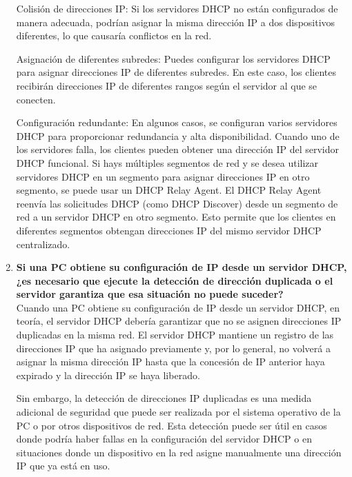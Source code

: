 \documentclass[a4paper]{article}
\begin{document}
\begin{enumerate}
	Colisión de direcciones IP: Si los servidores DHCP no están configurados de manera adecuada, podrían asignar la misma dirección IP a dos dispositivos diferentes, lo que causaría conflictos en la red.
	
	Asignación de diferentes subredes: Puedes configurar los servidores DHCP para asignar direcciones IP de diferentes subredes. En este caso, los clientes recibirán direcciones IP de diferentes rangos según el servidor al que se conecten.
	
	Configuración redundante: En algunos casos, se configuran varios servidores DHCP para proporcionar redundancia y alta disponibilidad. Cuando uno de los servidores falla, los clientes pueden obtener una dirección IP del servidor DHCP funcional.
	Si hays múltiples segmentos de red y se desea utilizar servidores DHCP en un segmento para asignar direcciones IP en otro segmento, se puede usar un DHCP Relay Agent. El DHCP Relay Agent reenvía las solicitudes DHCP (como DHCP Discover) desde un segmento de red a un servidor DHCP en otro segmento. Esto permite que los clientes en diferentes segmentos obtengan direcciones IP del mismo servidor DHCP centralizado.
	\item \textbf{Si una PC obtiene su configuración de IP desde un servidor
DHCP, ¿es necesario que ejecute la detección de dirección
duplicada o el servidor garantiza que esa situación no puede
		suceder?
	}
\\
Cuando una PC obtiene su configuración de IP desde un servidor DHCP, en teoría, el servidor DHCP debería garantizar que no se asignen direcciones IP duplicadas en la misma red. El servidor DHCP mantiene un registro de las direcciones IP que ha asignado previamente y, por lo general, no volverá a asignar la misma dirección IP hasta que la concesión de IP anterior haya expirado y la dirección IP se haya liberado.

Sin embargo, la detección de direcciones IP duplicadas es una medida adicional de seguridad que puede ser realizada por el sistema operativo de la PC o por otros dispositivos de red. Esta detección puede ser útil en casos donde podría haber fallas en la configuración del servidor DHCP o en situaciones donde un dispositivo en la red asigne manualmente una dirección IP que ya está en uso.

\end{enumerate}
\end{document}

